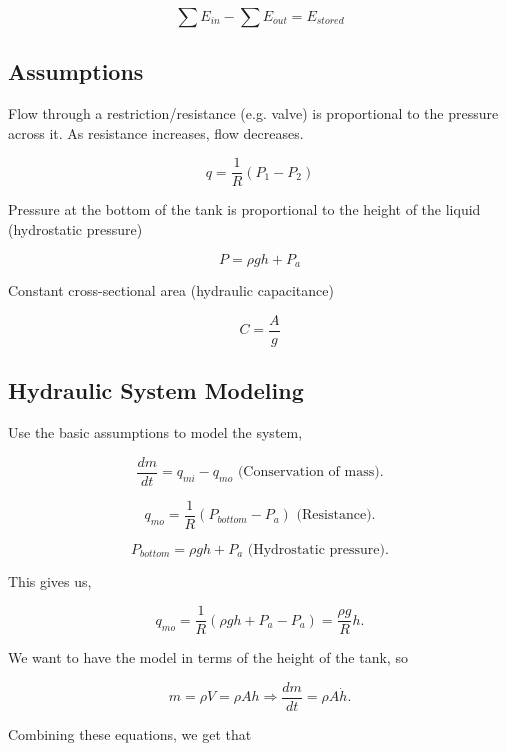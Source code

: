 \documentclass[12pt, a4paper]{report}
\begin{document}
  \begin{equation}
    \sum E_{in} - \sum E_{out} = E_{stored}
  \end{equation}

  \subsection{Assumptions}

  Flow through a restriction/resistance (e.g. valve) is proportional to the pressure across it. As resistance increases, flow decreases.

  \begin{equation}
    q = \frac{1}{R}(P_1 - P_2)
  \end{equation}

  Pressure at the bottom of the tank is proportional to the height of the liquid (hydrostatic pressure)

  \begin{equation}
    P = \rho gh + P_a
  \end{equation}

  Constant cross-sectional area (hydraulic capacitance)

  \begin{equation}
    C = \frac{A}{g}
  \end{equation}

  \subsection{Hydraulic System Modeling}

  Use the basic assumptions to model the system,

  \[
      \frac{dm}{dt} = q_{mi} - q_{mo} \text{ (Conservation of mass)}
    .\]

  \[
      q_{mo} = \frac{1}{R} \left( P_{bottom} - P_a \right) \text{ (Resistance)}
    .\]

  \[
      P_{bottom} = \rho gh + P_a \text{ (Hydrostatic pressure)}
    .\]

  This gives us,

  \[
      q_{mo} = \frac{1}{R} \left( \rho gh + P_a - P_a \right) = \frac{\rho g}{R}h
    .\]

  We want to have the model in terms of the height of the tank, so

  \[
      m = \rho V = \rho Ah \Rightarrow \frac{dm}{dt} = \rho A \dot h
    .\]

  Combining these equations, we get that
\end{document}
